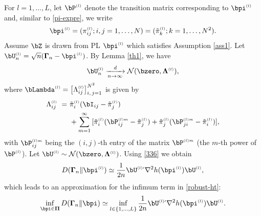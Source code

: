 \documentclass[10pt, twocolumn]{IEEEtran}
\begin{document}
For $l = 1,\ldots, L$, let $\bP^{{\scriptscriptstyle(l)}}$ denote the
transition matrix corresponding to $\bpi^{\scriptscriptstyle{(l)}}$ and,
similar to \eqref{pi-expre}, we write
\[
{{\bpi}^{\scriptscriptstyle{(l)}}} = ( {{\pi^{\scriptscriptstyle{(l)}}
    _{ij}}}; i,j = 1, \ldots, N )
= ( {{{\tilde {\pi}}^{\scriptscriptstyle{(l)}}_k}}; k = 1, \ldots, N^2 ).   
\]
Assume $\bZ$ is drawn from PL $\bpi^{\scriptscriptstyle{(l)}}$ which
satisfies Assumption \ref{ass1}. Let $\bU_n^{\scriptscriptstyle{(l)}} =
\sqrt n ( {{\boldsymbol{\Gamma} _n} - {\bpi ^{\scriptscriptstyle{(l)}}}}
)$. By Lemma \ref{th1}, we have
\begin{align}
\bU_n^{\scriptscriptstyle{(l)}} \xrightarrow[{n \to \infty
}]{{\textit{d}}}{\cal{N}}( {\bzero, {\boldsymbol{\Lambda} ^{\scriptscriptstyle{(l)}}}} ),  \label{clt-robust}
\end{align} 
where $\bLambda^{\scriptscriptstyle{(l)}} = \big[\Lambda ^{\scriptscriptstyle{(l)}}_
{ij}\big]_{i,\,j = 1}^{{N^2}}$ is given by
\begin{align}
\Lambda ^{\scriptscriptstyle{(l)}}_{ij} ~=~& {{\tilde \pi }_i^{\scriptscriptstyle{(l)}}}( {{\bI_{ij}} - {{\tilde \pi }_j^{\scriptscriptstyle{(l)}}}} ) \nonumber \\
&+ \sum\limits_{m = 1}^\infty  {[{{\tilde \pi }_i^{\scriptscriptstyle{(l)}}}( {\bP_{ij}^{\scriptscriptstyle{(l)}m} - {{\tilde \pi }_j^{\scriptscriptstyle{(l)}}}} ) 
	+ {{\tilde \pi }_j^{\scriptscriptstyle{(l)}}}( \bP_{ji}^{\scriptscriptstyle{(l)}m} - \tilde{\pi}_i^{\scriptscriptstyle{(l)}} )]},  \notag 
\end{align} 
with $\bP_{ij}^{\scriptscriptstyle{(l)}m}$ being the $(i,j)$-th entry of
the matrix $\bP^{\scriptscriptstyle{(l)}m}$ (the $m$-th power of
$\bP^{\scriptscriptstyle{(l)}}$). Let $\bU^{\scriptscriptstyle{(l)}}
\sim {\cal{N}}( {\bzero, {\boldsymbol{\Lambda} ^{\scriptscriptstyle{(l)}}}} )
$. Using \eqref{336} we obtain
\[ {D}( {{\boldsymbol{\Gamma} _n}\| {\bpi}^{\scriptscriptstyle{(l)}} } )
\simeq \frac{1}{{2n}}{\bU^{\scriptscriptstyle{(l)}\prime}}{\nabla
  ^2}h( {\bpi}^{\scriptscriptstyle{(l)}}
)\bU^{\scriptscriptstyle{(l)}},
\]
which leads to an approximation for the infimum term in \eqref{robust-ht}:
\begin{align}
\mathop {\inf }\limits_{\bpi  \in \boldsymbol{\Pi} } D( {{\boldsymbol{\Gamma} _n}\| \bpi  } ) \simeq \mathop {\inf }\limits_{l  \in \{1, \ldots, L\} } \frac{1}{{2n}}{\bU^{\scriptscriptstyle{(l)}\prime}}{\nabla
  ^2}h( {\bpi}^{\scriptscriptstyle{(l)}} )\bU^{\scriptscriptstyle{(l)}}.
  \label{approx-11}
\end{align}
\end{document}
